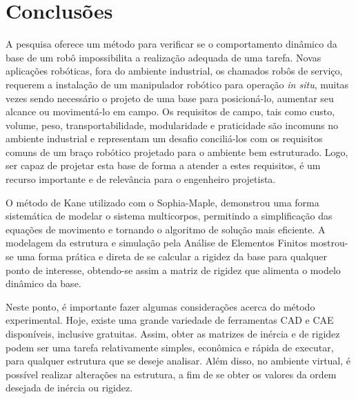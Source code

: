 \chapter{Conclusões}


A pesquisa oferece um método para verificar se o comportamento dinâmico da base
de um robô impossibilita a realização adequada de uma tarefa. Novas aplicações
robóticas, fora do ambiente industrial, os chamados robôs de serviço, requerem a
instalação de um manipulador robótico para operação \textit{in situ}, muitas
vezes sendo necessário o projeto de uma base para posicioná-lo, aumentar seu
alcance ou movimentá-lo em campo. Os requisitos de campo, tais como custo,
volume, peso, transportabilidade, modularidade e praticidade são incomuns no
ambiente industrial e representam um desafio conciliá-los com os requisitos
comuns de um braço robótico projetado para o ambiente bem estruturado. Logo, ser
capaz de projetar esta base de forma a atender a estes requisitos, é um recurso
importante e de relevância para o engenheiro projetista.


O método de Kane utilizado com o Sophia-Maple, demonstrou uma forma sistemática
de modelar o sistema multicorpos, permitindo a simplificação das equações de
movimento e tornando o algoritmo de solução mais eficiente. A modelagem da
estrutura e simulação pela Análise de Elementos Finitos mostrou-se uma forma
prática e direta de se calcular a rigidez da base para qualquer ponto de
interesse, obtendo-se assim a matriz de rigidez que alimenta o modelo dinâmico
da base.

Neste ponto, é importante fazer algumas considerações acerca do método
experimental.
Hoje, existe uma grande variedade de ferramentas CAD e CAE disponíveis,
inclusive gratuitas.
Assim, obter as matrizes de inércia e de rigidez podem ser uma tarefa
relativamente simples, econômica e rápida de executar, para qualquer estrutura
que se deseje analisar. Além disso, no ambiente virtual, é possível realizar
alterações na estrutura, a fim de se obter os valores da ordem desejada de
inércia ou rigidez.

